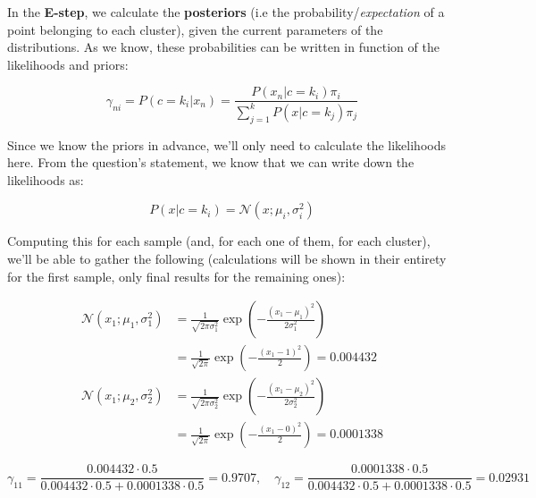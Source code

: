 \documentclass[12pt]{article}
\begin{document}
\begin{enumerate}[leftmargin=\labelsep]
  In the \textbf{E-step}, we calculate the \textbf{posteriors} (i.e the probability/\textit{expectation}
  of a point belonging to each cluster), given the current parameters of the
  distributions. As we know, these probabilities can be written in function of the
  likelihoods and priors:

  \begin{equation*}
    \gamma_{ni} = P(c = k_i | x_n) = \frac{P(x_n | c = k_i) \pi_i}{\sum_{j = 1}^k P(x | c = k_j) \pi_j}
  \end{equation*}

  Since we know the priors in advance, we'll only need to calculate the likelihoods here.
  From the question's statement, we know that we can write down the likelihoods as:

  \begin{equation*}
    P(x | c = k_i) = \mathcal{N}(x; \mu_i, \sigma_i^2)
  \end{equation*}

  Computing this for each sample (and, for each one of them, for each cluster), we'll
  be able to gather the following (calculations will be shown in their entirety for the
  first sample, only final results for the remaining ones):

  \begin{equation*}
    \begin{aligned}
      \mathcal{N} (x_1; \mu_1, \sigma_1^2) & = \frac{1}{\sqrt{2 \pi \sigma_1^2}} \exp \left( - \frac{(x_1 - \mu_1)^2}{2 \sigma_1^2} \right) \\
                                           & = \frac{1}{\sqrt{2 \pi}} \exp \left( - \frac{(x_1 - 1)^2}{2} \right) = 0.004432                \\
      \mathcal{N} (x_1; \mu_2, \sigma_2^2) & = \frac{1}{\sqrt{2 \pi \sigma_2^2}} \exp \left( - \frac{(x_1 - \mu_2)^2}{2 \sigma_2^2} \right) \\
                                           & = \frac{1}{\sqrt{2 \pi}} \exp \left( - \frac{(x_1 - 0)^2}{2} \right) = 0.0001338
    \end{aligned}
  \end{equation*}

  \begin{equation*}
    \gamma_{11} = \frac{0.004432 \cdot 0.5}{0.004432 \cdot 0.5 + 0.0001338 \cdot 0.5} = 0.9707, \quad
    \gamma_{12} = \frac{0.0001338 \cdot 0.5}{0.004432 \cdot 0.5 + 0.0001338 \cdot 0.5} = 0.02931
  \end{equation*}


\end{enumerate}
\end{document}
